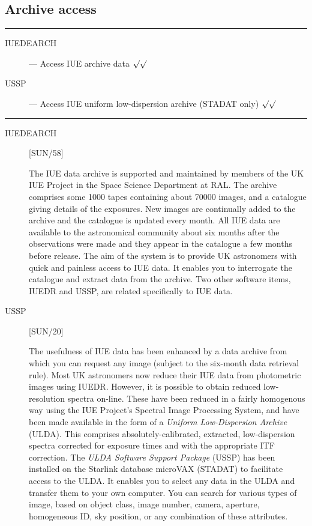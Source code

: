 \subsection{Archive access}

\rule{\textwidth}{0.5mm}
\begin{description}
\begin{description}
\item [IUEDEARCH] --- Access IUE archive data \hfill $\surd\surd$
\item [USSP] --- Access IUE uniform low-dispersion archive (STADAT only)
 \hfill $\surd\surd$
\end{description}
\end{description}
\rule{\textwidth}{0.5mm}

\begin{description}

\item [IUEDEARCH] \hfill [SUN/58]

The IUE data archive is supported and maintained by members of the UK IUE 
Project in the Space Science Department at RAL. 
The archive comprises some 1000 tapes containing about 70000 images, and a
catalogue giving details of the exposures.
New images are continually added to the archive and the catalogue is updated
every month.
All IUE data are available to the astronomical community about six months after
the observations were made and they appear in the catalogue a few months before
release.
The aim of the system is to provide UK astronomers with quick and painless 
access to IUE data.
It enables you to interrogate the catalogue and extract data from the
archive.
Two other software items, IUEDR and USSP,  are related specifically to IUE
data.

\item [USSP] \hfill [SUN/20]

The usefulness of IUE data has been enhanced by a data archive from which you
can request any image (subject  to the six-month data retrieval rule).
Most UK astronomers now reduce their IUE data from photometric images using
IUEDR.
However, it is possible to obtain reduced low-resolution spectra on-line.   
These have been reduced in a fairly homogenous way using the IUE Project's
Spectral Image Processing System, and have been made available in the form of a
{\it Uniform Low-Dispersion Archive} (ULDA).  
This comprises absolutely-calibrated, extracted, low-dispersion spectra 
corrected for exposure times and with the appropriate ITF correction.
The {\it ULDA Software Support Package} (USSP) has been installed on the
Starlink database microVAX (STADAT) to facilitate access to the ULDA.
It enables you to select any data in the ULDA and transfer them to your own
computer.
You can search for various types of image, based on object class, image number,
camera, aperture, homogeneous ID, sky position, or any combination of these
attributes.
\end{description}


